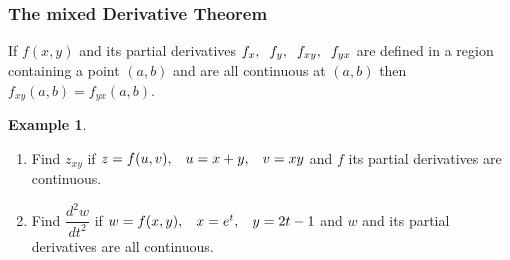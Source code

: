\documentclass[11pt,a4paper]{article}
\theoremstyle{definition}
\newtheorem{exa}[thm]{Example}
\begin{document}
\subsubsection{The mixed Derivative Theorem}
If $f(x,y)$ and its partial derivatives $f_x, \hspace{0.2cm} f_y, \hspace{0.2cm} f_{xy}, \hspace{0.2cm} f_{yx}$ are defined in a region containing a point $(a,b)$ and are all continuous at $(a,b)$ then $f_{xy}(a,b) = f_{yx}(a,b)$.


\begin{exa}
\begin{enumerate}
\item Find $z_{xy}$ if $z = f(u,v), \hspace{0.3cm} u = x + y,\hspace{0.3cm} v =xy$ and $f$ its partial derivatives are continuous.
\item Find $\dfrac{d^2w}{dt^2}$ if $w = f(x,y),\hspace{0.3cm} x = e^t,\hspace{0.3cm} y = 2t - 1$ and $w$ and its partial derivatives are all continuous.
\end{enumerate}
\end{exa}
\end{document}
